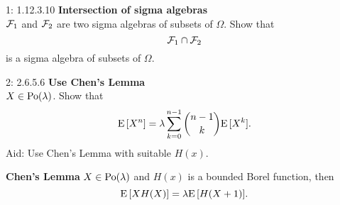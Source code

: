 \documentclass[a4paper,twoside=false,abstract=false,numbers=noenddot,
titlepage=false,headings=small,parskip=half,version=last]{scrartcl}
\begin{document}

\begin{exercise}{1: 1.12.3.10} {\bf Intersection of sigma algebras}   \\
    $\mathcal{F}_1$ and $\mathcal{F}_2$ are two sigma algebras of subsets of $\Omega$. Show
    that
    \begin{equation}
        \mathcal{F}_1 \cap \mathcal{F}_2
    \end{equation}
    is a sigma algebra of subsets of $\Omega$.
\end{exercise}
\begin{solution}
\end{solution}
\pagebreak

\begin{exercise}{2: 2.6.5.6} \textbf{Use Chen's Lemma} \\
    $X \in \text{Po}(\lambda)$. Show that
    \begin{equation}
        {\rm E}\,[X^n] =
        \lambda \sum\limits_{k=0}^{n-1} \binom{n-1}{k}{\rm E}\,[X^k].
    \end{equation}
    Aid: Use Chen's Lemma with suitable $H(x)$.
\end{exercise}
\begin{solution}
    \begin{lemma}
        \label{lemma:chen}  %
        \textbf{Chen's Lemma} $X \in \text{Po}(\lambda)$ and $H(x)$ is a bounded
        Borel function, then
        \begin{equation}
            \label{eq:chen}
            {\rm E}\,[XH(X)] = \lambda{\rm E}\,[H(X+1)].
        \end{equation}
    \end{lemma}
\end{solution}
\pagebreak
\end{document}
